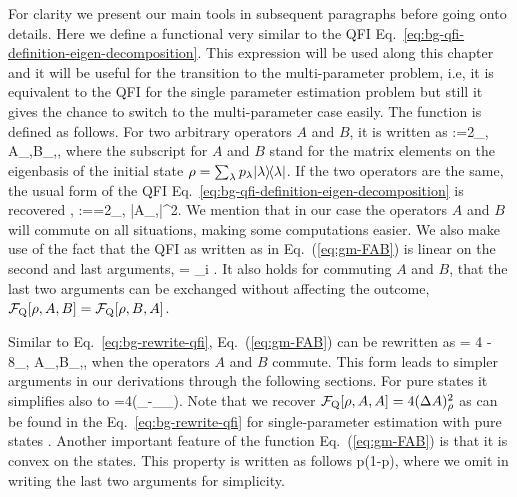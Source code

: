 For clarity we present our main tools in subsequent paragraphs before going onto details.
Here we define a functional very similar to the QFI Eq.~\ref{eq:bg-qfi-definition-eigen-decomposition}.
This expression will be used along this chapter and it will be useful for the transition to the multi-parameter problem, i.e, it is equivalent to the QFI for the single parameter estimation problem but still it gives the chance to switch to the multi-parameter case easily.
The function is defined as follows.
For two arbitrary operators $A$ and $B$, it is written as
\be
  \label{eq:gm-FAB}
  :=2\sum_{\lambda,\nu}
  {A}_{\lambda,\nu}{B}_{\nu,\lambda},
\ee
where the subscript for $A$ and $B$ stand for the matrix elements on the eigenbasis of the initial state $\rho = \sum_\lambda p_\lambda\vert{\lambda}\rangle{\!}\langle{\lambda}\vert$.
If the two operators are the same, the usual form of the QFI Eq.~\eqref{eq:bg-qfi-definition-eigen-decomposition} is recovered \cite{Paris2009,Braunstein1994,Holevo1982,Helstrom1976,Petz2002,Petz2008},
\be
  :==2\sum_{\lambda,\nu}
   |{A}_{\lambda,\nu}|^2.
\ee
We mention that in our case the operators $A$ and $B$ will commute on all situations, making some computations easier.
We also make use of the fact that the QFI as written as in Eq.~(\ref{eq:gm-FAB}) is linear on the second and last arguments,
\be
  \label{eq:gm-qfi-linear-in-arguments}
   = \sum_i .
\ee
It also holds for commuting $A$ and $B$, that the last two arguments can be exchanged without affecting the outcome, $\mathcal{F}_{\textnormal{Q}}[{\textstyle \rho, A, B}] = \mathcal{F}_{\textnormal{Q}}[{\textstyle \rho, B,A}]$.

Similar to Eq.~\eqref{eq:bg-rewrite-qfi}, Eq.~(\ref{eq:gm-FAB}) can be rewritten as
\be
  \label{eq:gm-QFI for two operators rewrited}
   = 4 
  - 8\sum_{\lambda,\nu} 
  {A}_{\lambda,\nu}{B}_{\nu,\lambda},
\ee
when the operators $A$ and $B$ commute.
This form leads to simpler arguments in our derivations through the following sections.
For pure states it simplifies also to
\be
  =4\left(_{\psi}-_{\psi}_{\psi}\right).
  \label{eq:gm-QFI_pure}
\ee
Note that we recover $\mathcal{F}_{\textnormal{Q}}[{\textstyle \rho,A,A}]=4(\Delta A)_\rho^2$ as can be found in the Eq.~\eqref{eq:bg-rewrite-qfi} for single-parameter estimation with pure states \cite{Paris2009,Toth2013}.
Another important feature of the function Eq.~(\ref{eq:gm-FAB}) is that it is convex on the states.
This property is written as follows
\be
  \leqslant
  p(1{-}p),
  \label{eq:gm-FAB-convex}
\ee
where we omit in writing the last two arguments for simplicity.

